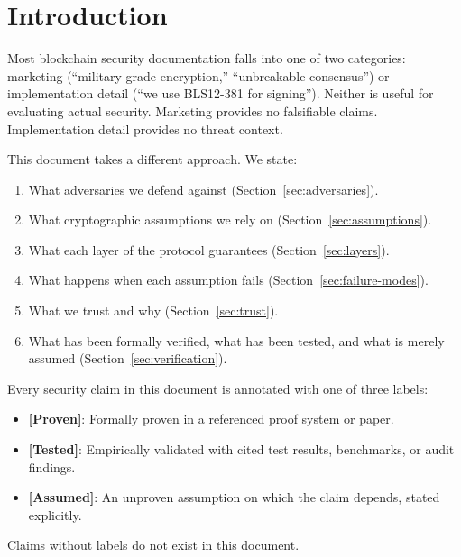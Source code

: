 \section{Introduction}

\label{sec:introduction}

Most blockchain security documentation falls into one of two categories: marketing
(``military-grade encryption,'' ``unbreakable consensus'') or implementation detail
(``we use BLS12-381 for signing''). Neither is useful for evaluating actual security.
Marketing provides no falsifiable claims. Implementation detail provides no threat
context.

This document takes a different approach. We state:

\begin{enumerate}[leftmargin=2em]
  \item What adversaries we defend against (Section~\ref{sec:adversaries}).
  \item What cryptographic assumptions we rely on (Section~\ref{sec:assumptions}).
  \item What each layer of the protocol guarantees (Section~\ref{sec:layers}).
  \item What happens when each assumption fails (Section~\ref{sec:failure-modes}).
  \item What we trust and why (Section~\ref{sec:trust}).
  \item What has been formally verified, what has been tested, and what is merely
        assumed (Section~\ref{sec:verification}).
\end{enumerate}

\begin{invariant}
\label{inv:main}
Every security claim in this document is annotated with one of three labels:
\begin{itemize}[leftmargin=2em]
  \item \textbf{[Proven]}: Formally proven in a referenced proof system or paper.
  \item \textbf{[Tested]}: Empirically validated with cited test results, benchmarks,
        or audit findings.
  \item \textbf{[Assumed]}: An unproven assumption on which the claim depends,
        stated explicitly.
\end{itemize}
Claims without labels do not exist in this document.
\end{invariant}

